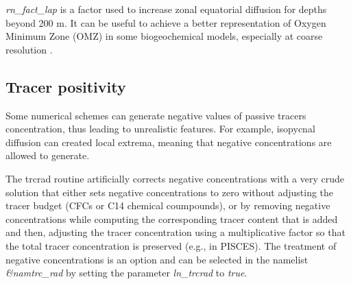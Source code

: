 \documentclass[../main/TOP_manual]{subfiles}
\begin{document}
\textit{rn\_fact\_lap} is a factor used to increase zonal equatorial diffusion for depths beyond 200 m. It can be useful to achieve a better representation of Oxygen Minimum Zone (OMZ) in some biogeochemical models, especially at coarse resolution \citep{getzlaff_2013}.



\subsection{Tracer positivity}

Some numerical schemes can generate negative values of passive tracers concentration, thus leading to unrealistic features.
For example, isopycnal diffusion can created local extrema, meaning that negative concentrations are allowed to generate.

The trcrad routine artificially corrects negative concentrations with a very crude solution that either sets negative concentrations to zero without adjusting the tracer budget (CFCs or C14 chemical coumpounds), or by removing negative concentrations while computing the corresponding tracer content that is added and then, adjusting the tracer concentration using a multiplicative factor so that the total tracer concentration is preserved (e.g., in PISCES).
The treatment of negative concentrations is an option and can be selected in the namelist \textit{\&namtrc\_rad} by setting the parameter \textit{ln\_trcrad} to \textit{true}.

\end{document}
